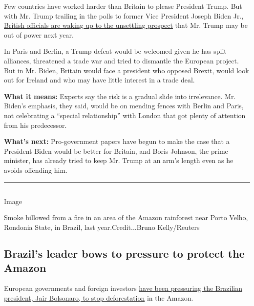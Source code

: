 Few countries have worked harder than Britain to please President Trump.
But with Mr. Trump trailing in the polls to former Vice President Joseph
Biden Jr.,
\href{https://www.nytimes.com/2020/07/31/world/europe/britain-biden-presidency-johnson.html}{British
officials are waking up to the unsettling prospect} that Mr. Trump may
be out of power next year.

In Paris and Berlin, a Trump defeat would be welcomed given he has split
alliances, threatened a trade war and tried to dismantle the European
project. But in Mr. Biden, Britain would face a president who opposed
Brexit, would look out for Ireland and who may have little interest in a
trade deal.

\textbf{What it means:} Experts say the risk is a gradual slide into
irrelevance. Mr. Biden's emphasis, they said, would be on mending fences
with Berlin and Paris, not celebrating a ``special relationship'' with
London that got plenty of attention from his predecessor.

\textbf{What's next:} Pro-government papers have begun to make the case
that a President Biden would be better for Britain, and Boris Johnson,
the prime minister, has already tried to keep Mr. Trump at an arm's
length even as he avoids offending him.

\begin{center}\rule{0.5\linewidth}{\linethickness}\end{center}

\hypertarget{-1}{%
\subsection{}\label{-1}}

Image

Smoke billowed from a fire in an area of the Amazon rainforest near
Porto Velho, Rondonia State, in Brazil, last year.Credit...Bruno
Kelly/Reuters

\hypertarget{brazils-leader-bows-to-pressure-to-protect-the-amazon}{%
\subsection{Brazil's leader bows to pressure to protect the
Amazon}\label{brazils-leader-bows-to-pressure-to-protect-the-amazon}}

European governments and foreign investors
\href{https://www.nytimes.com/2020/08/01/world/americas/Brazil-amazon-deforestation-bolsonaro.html?referringSource=articleShare}{have
been pressuring the Brazilian president, Jair Bolsonaro, to stop
deforestation} in the Amazon.

